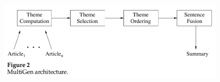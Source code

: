 \documentclass[xcolor={table}]{beamer}
\begin{document}
\begin{frame}[t]{\cite{barzilay2005sentence}}
      \begin{figure}[h]
          \centering
      \includegraphics[scale=.3]{images/figure2-barzilay05.png} \\
\end{figure}
\end{frame}
\end{document}
